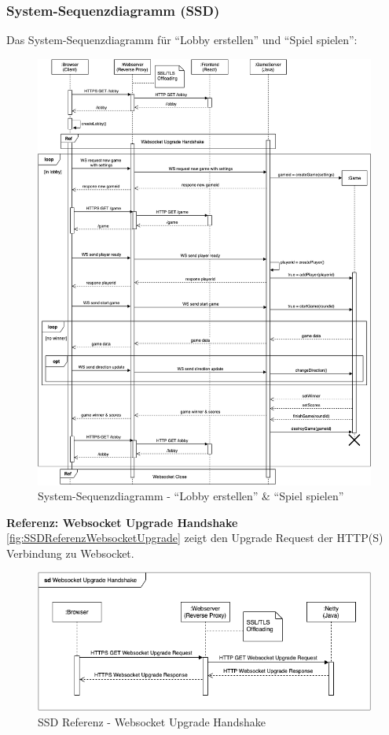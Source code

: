 \documentclass[11pt,ngerman]{article}
\newcommand{\quotes}[1]{``#1''}
\begin{document}
    \newpage
    \subsubsection{System-Sequenzdiagramm (SSD)}
    \label{sssec:SSDFromProjectOutline}
    Das System-Sequenzdiagramm für \quotes{Lobby erstellen} und \quotes{Spiel spielen}:
    \begin{figure}[H]
    	\includegraphics[scale=0.5]{figures/SystemSequenceDiagram.png}
    	\caption{System-Sequenzdiagramm - \quotes{Lobby erstellen} \&  \quotes{Spiel spielen}}
    \end{figure}
    \newpage
    \noindent \textbf{Referenz: \Gls{Websocket} Upgrade Handshake} \\
    \autoref{fig:SSDReferenzWebsocketUpgrade} zeigt den Upgrade Request der HTTP(S) Verbindung  zu \Gls{Websocket}.
    \begin{figure}[H]
    	\centering
    	\includegraphics[scale=0.6]{figures/SSD-Websocket_Upgrade_Handshake.png}
    	\caption{SSD Referenz - \Gls{Websocket} Upgrade Handshake}
    	\label{fig:SSDReferenzWebsocketUpgrade}
    \end{figure}
\end{document}
